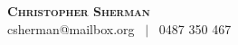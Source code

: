 \documentclass[letterpaper,12pt]{res}
\begin{document}
\noindent \textbf{\Huge \scshape Christopher Sherman} \\ 
\vspace{0.2cm}
csherman@mailbox.org \ $|$ \ 0487 350 467  \\










 
\end{document}
